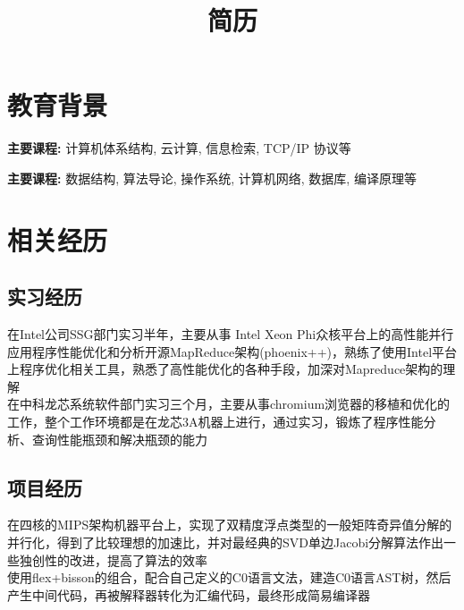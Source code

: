 \documentclass[11pt,a4paper]{moderncv}
\title{简历}               %
\begin{document}
\maketitle

\section{教育背景}

{\textbf{主要课程: }   计算机体系结构, 云计算, 信息检索, TCP/IP 协议等}  %

{\textbf{主要课程: }  数据结构, 算法导论, 操作系统, 计算机网络, 数据库, 编译原理等}  %


\section{相关经历}
\subsection{实习经历}
{在Intel公司SSG部门实习半年，主要从事 Intel Xeon Phi众核平台上的高性能并行应用程序性能优化和分析开源MapReduce架构(phoenix++)，熟练了使用Intel平台上程序优化相关工具，熟悉了高性能优化的各种手段，加深对Mapreduce架构的理解\\}%
{在中科龙芯系统软件部门实习三个月，主要从事chromium浏览器的移植和优化的工作，整个工作环境都是在龙芯3A机器上进行，通过实习，锻炼了程序性能分析、查询性能瓶颈和解决瓶颈的能力\\}%
\subsection{项目经历}
{在四核的MIPS架构机器平台上，实现了双精度浮点类型的一般矩阵奇异值分解的并行化，得到了比较理想的加速比，并对最经典的SVD单边Jacobi分解算法作出一些独创性的改进，提高了算法的效率\\}                %
{使用flex+bisson的组合，配合自己定义的C0语言文法，建造C0语言AST树，然后产生中间代码，再被解释器转化为汇编代码，最终形成简易编译器\\}                %
\end{document}
